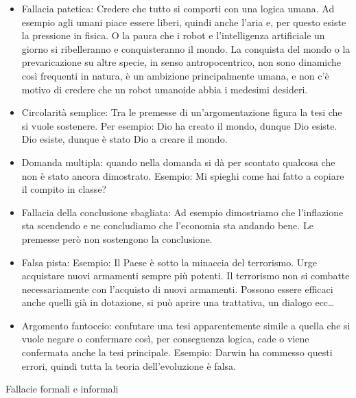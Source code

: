 \documentclass[12pt]{book} %
\begin{document}
\begin{itemize}
\item Fallacia patetica: Credere che tutto si comporti con una logica umana. Ad esempio agli umani piace essere liberi,
quindi anche l'aria e, per questo esiste la pressione in fisica. O la paura che i robot e
l'intelligenza artificiale un giorno si ribelleranno e conquisteranno il mondo. La conquista del
mondo o la prevaricazione su altre specie, in senso antropocentrico, non sono dinamiche così frequenti in natura, è un ambizione principalmente umana, e non c'è motivo di credere che un robot umanoide abbia i medesimi desideri.
\item Circolarità semplice: Tra le premesse di un'argomentazione figura la tesi che si vuole sostenere. Per esempio: Dio
ha creato il mondo, dunque Dio esiste. Dio esiste, dunque è stato Dio a creare il mondo.
\item Domanda multipla: quando nella domanda si dà per scontato qualcosa che non è stato ancora dimostrato. Esempio: Mi
spieghi come hai fatto a copiare il compito in classe?
\item Fallacia della conclusione sbagliata: Ad esempio dimostriamo che l'inflazione sta scendendo e
ne concludiamo che l'economia sta andando bene. Le premesse però non sostengono la conclusione.
\item Falsa pista: Esempio: Il Paese è sotto la minaccia del terrorismo. Urge acquistare nuovi armamenti sempre più
potenti. Il terrorismo non si combatte necessariamente con l'acquisto di nuovi armamenti. Possono essere efficaci anche
quelli già in dotazione, si può aprire una trattativa, un dialogo ecc…
\item Argomento fantoccio: confutare una tesi apparentemente simile a quella che si vuole negare o confermare così, per
conseguenza logica, cade o viene confermata anche la tesi principale. Esempio: Darwin ha commesso questi errori, quindi
tutta la teoria dell'evoluzione è falsa.
\end{itemize}

Fallacie formali e informali
\end{document}
